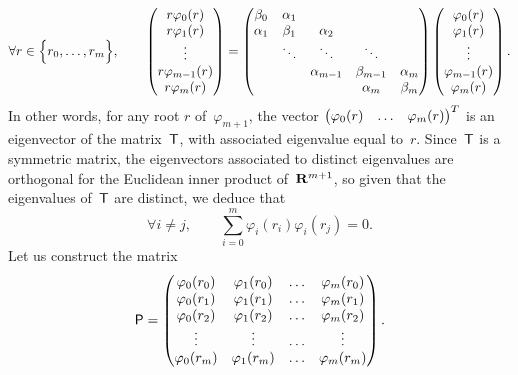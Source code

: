 \[
    \forall r \in \Bigl\{ r_0, \dotsc, r_m \Bigr\}, \qquad
    \begin{pmatrix}
        r \varphi_0(r) \\
        r \varphi_1(r) \\
        \vdots \\
        r \varphi_{m-1}(r) \\
        r \varphi_m(r)
    \end{pmatrix}
    =
    \begin{pmatrix}
        \beta_0 & \alpha_1 \\
        \alpha_1 & \beta_1 & \alpha_2 \\
                 & \ddots & \ddots & \ddots \\
                 & & \alpha_{m-1} & \beta_{m-1} & \alpha_m \\
                 & & & \alpha_m & \beta_m
    \end{pmatrix}
    \begin{pmatrix}
        \varphi_0(r) \\
        \varphi_1(r) \\
        \vdots \\
        \varphi_{m-1}(r) \\
        \varphi_m(r)
    \end{pmatrix}.
\]
In other words,
for any root $r$ of~$\varphi_{m+1}$,
the vector $\begin{pmatrix} \varphi_0(r) & \hdots & \varphi_m(r) \end{pmatrix}^T$
is an eigenvector of the matrix~$\mathsf T$,
with associated eigenvalue equal to~$r$.
Since~$\mathsf T$ is a symmetric matrix,
the eigenvectors associated to distinct eigenvalues are orthogonal for the Euclidean inner product of~$\mathbf R^{m+1}$,
so given that the eigenvalues of~$\mathsf T$ are distinct,
we deduce that
\begin{equation}
    \label{eq:orthogonality}
    \forall i \neq j, \qquad
    \sum_{i=0}^{m} \varphi_i(r_i) \varphi_i(r_j) = 0.
\end{equation}
Let us construct the matrix
\[
    \mathsf P =
    \begin{pmatrix}
        \varphi_0(r_0) & \varphi_1(r_0) & \hdots & \varphi_m(r_0) \\
        \varphi_0(r_1) & \varphi_1(r_1) & \hdots & \varphi_m(r_1) \\
        \varphi_0(r_2) & \varphi_1(r_2) & \hdots & \varphi_m(r_2) \\
        \vdots & \vdots & \hdots & \vdots \\
        \varphi_0(r_m) & \varphi_1(r_m) & \hdots & \varphi_m(r_m)
    \end{pmatrix}.
\]
